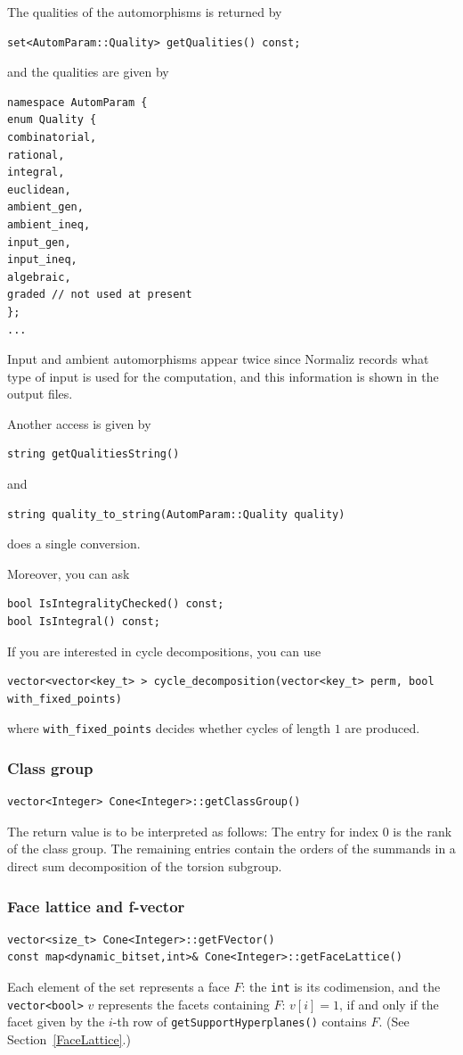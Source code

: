\begin{small}
The qualities of the automorphisms is returned by
\begin{Verbatim}
set<AutomParam::Quality> getQualities() const;
\end{Verbatim}
and the qualities are given by
\begin{Verbatim} 
namespace AutomParam {
enum Quality {
combinatorial,
rational,
integral,
euclidean,
ambient_gen,
ambient_ineq,
input_gen,
input_ineq,
algebraic,
graded // not used at present
};
...
\end{Verbatim}
Input and ambient automorphisms appear twice since Normaliz records what type of input is used for the computation, and this information is shown in the output files.

Another access is given by
\begin{Verbatim}
string getQualitiesString()
\end{Verbatim}
and
\begin{Verbatim}
string quality_to_string(AutomParam::Quality quality)
\end{Verbatim}
does a single conversion.

Moreover, you can ask
\begin{Verbatim}
bool IsIntegralityChecked() const;
bool IsIntegral() const;
\end{Verbatim}

If you are interested in cycle decompositions, you can use
\begin{Verbatim}
vector<vector<key_t> > cycle_decomposition(vector<key_t> perm, bool with_fixed_points)
\end{Verbatim}
where \verb|with_fixed_points| decides whether cycles of length $1$ are produced.

\subsubsection{Class group}

\begin{Verbatim}
vector<Integer> Cone<Integer>::getClassGroup()
\end{Verbatim}
The return value is to be interpreted as follows: The entry for index $0$ is the rank of the class group. The remaining entries contain the orders of the summands in a direct sum decomposition of the torsion subgroup.

\subsubsection{Face lattice and f-vector}
\begin{Verbatim}
vector<size_t> Cone<Integer>::getFVector()
const map<dynamic_bitset,int>& Cone<Integer>::getFaceLattice()
\end{Verbatim}
Each element of the set represents a face $F$: the \verb|int| is its codimension, and the \verb|vector<bool>| $v$ represents the facets containing $F$: $v[i]=1$, if and only if the facet given by the $i$-th row of \verb|getSupportHyperplanes()| contains $F$. (See Section~\ref{FaceLattice}.)


\end{small}
